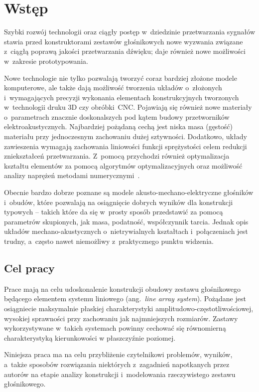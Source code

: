 \documentclass[12pt]{oska}
\affiliation{Akademia Górniczo-Hutnicza im. S. Staszica w Krakowie}
\begin{document}
	
	\maketitles
	
	\section{Wstęp}
	
	Szybki rozwój technologii oraz ciągły postęp w~dziedzinie przetwarzania sygnałów stawia przed konstruktorami zestawów głośnikowych nowe wyzwania związane z~ciągłą poprawą jakości przetwarzania dźwięku; daje również nowe możliwości w~zakresie prototypowania. 
	
	Nowe technologie nie tylko pozwalają tworzyć coraz bardziej złożone modele komputerowe, ale także dają możliwość tworzenia układów o~złożonych i~wymagających precyzji wykonania elementach konstrukcyjnych tworzonych w~technologii druku 3D czy obróbki~CNC. Pojawiają się również nowe materiały o~parametrach znacznie doskonalszych pod kątem budowy przetworników elektroakustycznych. Najbardziej pożądaną cechą jest niska masa (gęstość) materiału przy jednoczesnym zachowaniu dużej sztywności. Dodatkowo, układy zawieszenia wymagają zachowania liniowości funkcji sprężystości celem redukcji zniekształceń przetwarzania. Z~pomocą przychodzi również optymalizacja kształtu elementów za pomocą algorytmów optymalizacyjnych oraz możliwość analizy naprężeń metodami numerycznymi~\cite{naprezenia}.
	
	Obecnie bardzo dobrze poznane są modele akusto-mechano-elektryczne głośników i~obudów, które pozwalają na osiągnięcie dobrych wyników dla konstrukcji typowych -- takich które da się w~prosty sposób przedstawić za pomocą parametrów skupionych, jak masa, podatność, współczynnik tarcia. Jednak opis układów mechano-akustycznych o~nietrywialnych kształtach i~połączeniach jest trudny, a~często nawet niemożliwy z~praktycznego punktu widzenia.
	
	\subsection{Cel pracy}
	
	Prace mają na celu udoskonalenie konstrukcji obudowy zestawu głośnikowego będącego elementem systemu liniowego (ang.~\textit{line array system}). Pożądane jest osiągniecie maksymalnie płaskiej charakterystyki amplitudowo-częstotliwościowej, wysokiej sprawności przy zachowaniu jak najmniejszych rozmiarów. Zastawy wykorzystywane w~takich systemach powinny cechować się równomierną charakterystyką kierunkowości w płaszczyźnie poziomej.
	
	Niniejsza praca ma na celu przybliżenie czytelnikowi problemów, wyników, a~także sposobów rozwiązania niektórych z~zagadnień napotkanych przez autorów na etapie analizy konstrukcji i~modelowania rzeczywistego zestawu głośnikowego.
	
\end{document}
